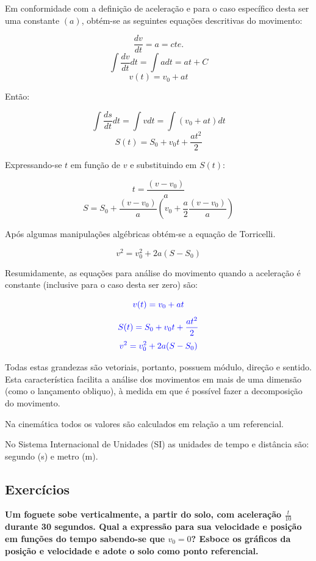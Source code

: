 \documentclass[
    12pt, %
    openright,
    twoside, %
    a4paper, %
    article,
    english,brazil %
]{abntex2}
\begin{document}
Em conformidade com a definição de aceleração e para o caso específico desta ser uma constante $(a)$, obtém-se as seguintes equações descritivas do movimento:

$$ \frac{dv}{dt} = a = cte. $$
$$ \int \frac{dv}{dt} dt = \int a dt = at + C $$
$$ v(t) = v_0 + at $$

Então:

$$ \int \frac{ds}{dt} dt = \int v dt = \int (v_0 + at) dt $$
$$ S(t) = S_0 + v_0 t + \frac{a t^2}{2} $$

Expressando-se $t$ em função de $v$ e substituindo em $S(t)$:

$$t = \frac{(v - v_0)}{a}$$
$$S = S_0 + \frac{(v - v_0)}{a}(v_0 + \frac{a}{2}\frac{(v - v_0)}{a})$$

Após algumas manipulações algébricas obtém-se a equação de Torricelli. 

$$v^2 = v_0^2 + 2a(S-S_0)$$

Resumidamente, as equações para análise do movimento quando a aceleração é constante (inclusive para o caso desta ser zero) são:

\begin{equation}
    \color{blue}
    v(t) = v_0 + at
\end{equation}
\begin{equation}
    \color{blue}
    S(t) = S_0 + v_0t + \frac{at^2}{2}    
\end{equation}
\begin{equation}
    \color{blue}
    v^2 = v_0^2 + 2a(S - S_0)
\end{equation}

Todas estas grandezas são vetoriais, portanto, possuem módulo, direção e sentido. Esta característica facilita a análise dos movimentos em mais de uma dimensão (como o lançamento obliquo), à medida em que é possível fazer a decomposição do movimento.

Na cinemática todos os valores são calculados em relação a um referencial.

No Sistema Internacional de Unidades (SI) as unidades de tempo e distância são: segundo (s) e metro (m).

\subsection{Exercícios}

\textbf{Um foguete sobe verticalmente, a partir do solo, com aceleração $\frac{t}{10}$ durante 30 segundos. Qual a expressão para sua velocidade e posição em funções do tempo sabendo-se que $v_0 = 0$? Esboce os gráficos da posição e velocidade e adote o solo como ponto referencial.}
\end{document}
